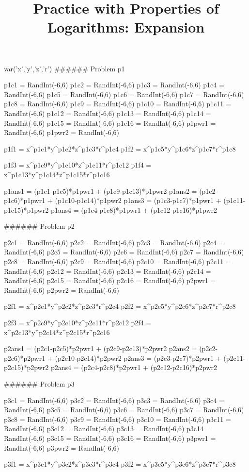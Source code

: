 \documentclass{ximeraXloud}
\title{Practice with Properties of Logarithms: Expansion}
\begin{document}


\begin{sagesilent}
var('x','y','z','r')
###### Problem p1

p1c1 = RandInt(-6,6)
p1c2 = RandInt(-6,6)
p1c3 = RandInt(-6,6)
p1c4 = RandInt(-6,6)
p1c5 = RandInt(-6,6)
p1c6 = RandInt(-6,6)
p1c7 = RandInt(-6,6)
p1c8 = RandInt(-6,6)
p1c9 = RandInt(-6,6)
p1c10 = RandInt(-6,6)
p1c11 = RandInt(-6,6)
p1c12 = RandInt(-6,6)
p1c13 = RandInt(-6,6)
p1c14 = RandInt(-6,6)
p1c15 = RandInt(-6,6)
p1c16 = RandInt(-6,6)
p1pwr1 = RandInt(-6,6)
p1pwr2 = RandInt(-6,6)

p1f1 = x^p1c1*y^p1c2*z^p1c3*r^p1c4
p1f2 = x^p1c5*y^p1c6*z^p1c7*r^p1c8

p1f3 = x^p1c9*y^p1c10*z^p1c11*r^p1c12
p1f4 = x^p1c13*y^p1c14*z^p1c15*r^p1c16

p1ans1 = (p1c1-p1c5)*p1pwr1 + (p1c9-p1c13)*p1pwr2
p1ans2 = (p1c2-p1c6)*p1pwr1 + (p1c10-p1c14)*p1pwr2
p1ans3 = (p1c3-p1c7)*p1pwr1 + (p1c11-p1c15)*p1pwr2
p1ans4 = (p1c4-p1c8)*p1pwr1 + (p1c12-p1c16)*p1pwr2


###### Problem p2

p2c1 = RandInt(-6,6)
p2c2 = RandInt(-6,6)
p2c3 = RandInt(-6,6)
p2c4 = RandInt(-6,6)
p2c5 = RandInt(-6,6)
p2c6 = RandInt(-6,6)
p2c7 = RandInt(-6,6)
p2c8 = RandInt(-6,6)
p2c9 = RandInt(-6,6)
p2c10 = RandInt(-6,6)
p2c11 = RandInt(-6,6)
p2c12 = RandInt(-6,6)
p2c13 = RandInt(-6,6)
p2c14 = RandInt(-6,6)
p2c15 = RandInt(-6,6)
p2c16 = RandInt(-6,6)
p2pwr1 = RandInt(-6,6)
p2pwr2 = RandInt(-6,6)

p2f1 = x^p2c1*y^p2c2*z^p2c3*r^p2c4
p2f2 = x^p2c5*y^p2c6*z^p2c7*r^p2c8

p2f3 = x^p2c9*y^p2c10*z^p2c11*r^p2c12
p2f4 = x^p2c13*y^p2c14*z^p2c15*r^p2c16

p2ans1 = (p2c1-p2c5)*p2pwr1 + (p2c9-p2c13)*p2pwr2
p2ans2 = (p2c2-p2c6)*p2pwr1 + (p2c10-p2c14)*p2pwr2
p2ans3 = (p2c3-p2c7)*p2pwr1 + (p2c11-p2c15)*p2pwr2
p2ans4 = (p2c4-p2c8)*p2pwr1 + (p2c12-p2c16)*p2pwr2


###### Problem p3

p3c1 = RandInt(-6,6)
p3c2 = RandInt(-6,6)
p3c3 = RandInt(-6,6)
p3c4 = RandInt(-6,6)
p3c5 = RandInt(-6,6)
p3c6 = RandInt(-6,6)
p3c7 = RandInt(-6,6)
p3c8 = RandInt(-6,6)
p3c9 = RandInt(-6,6)
p3c10 = RandInt(-6,6)
p3c11 = RandInt(-6,6)
p3c12 = RandInt(-6,6)
p3c13 = RandInt(-6,6)
p3c14 = RandInt(-6,6)
p3c15 = RandInt(-6,6)
p3c16 = RandInt(-6,6)
p3pwr1 = RandInt(-6,6)
p3pwr2 = RandInt(-6,6)

p3f1 = x^p3c1*y^p3c2*z^p3c3*r^p3c4
p3f2 = x^p3c5*y^p3c6*z^p3c7*r^p3c8


\end{sagesilent}
\end{document}
